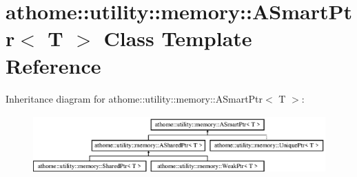 \hypertarget{classathome_1_1utility_1_1memory_1_1_a_smart_ptr}{}\section{athome\+:\+:utility\+:\+:memory\+:\+:A\+Smart\+Ptr$<$ T $>$ Class Template Reference}
\label{classathome_1_1utility_1_1memory_1_1_a_smart_ptr}
Inheritance diagram for athome\+:\+:utility\+:\+:memory\+:\+:A\+Smart\+Ptr$<$ T $>$\+:\begin{figure}[H]
\begin{center}
\leavevmode
\includegraphics[height=2.258065cm]{classathome_1_1utility_1_1memory_1_1_a_smart_ptr}
\end{center}
\end{figure}
